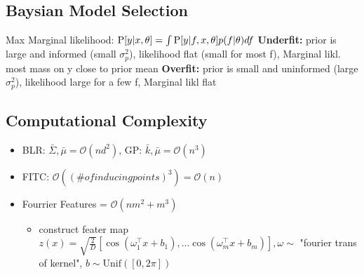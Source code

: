 \subsection{Baysian Model Selection}
Max Marginal likelihood: $\prob{y|x, \theta} = \int \prob {y|f,x,\theta}p(f|\theta)df$
\textbf{Underfit:} prior is large and informed (small $\sigma_{p}^{2}$), likelihood flat (small for most f), Marginal likl. most mass on y close to prior mean
\textbf{Overfit:} prior is small and uninformed (large $\sigma_{p}^{2}$), likelihood large for a few f, Marginal likl flat


\subsection{Computational Complexity}
\begin{itemize}
    \item BLR: $\bar{\Sigma},\bar{\mu} = \mathcal{O}(nd^{2})$, GP: $\bar{k},\bar{\mu} = \mathcal{O}(n^{3})$
    \item FITC: $\mathcal{O}((\# of inducing points)^{3}) = \mathcal{O}(n)$
    \item Fourrier Features = $\mathcal{O}(nm^{2}+m^{3})$
    \begin{itemize}
        \item construct feater map $z(x)= \sqrt {\frac{2}{D}}\left[ \cos(\omega_{1}^{\top}x +b_{1}),
            ...\cos(\omega_{m}^{\top}x +b_{m}) \right], \omega \sim$ "fourier trans of kernel",
        $b \sim \text{Unif}(\left[ 0,2\pi \right])$
    \end{itemize}
\end{itemize}

